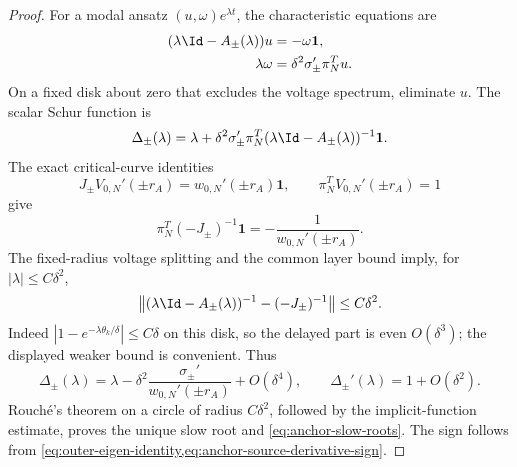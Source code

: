 \begin{proof}
For a modal ansatz \((u,\omega)e^{\lambda t}\), the characteristic equations
are
\begin{align}
 (\lambda\Id-A_\pm(\lambda))u&=-\omega\mathbf1,\notag\\
 \lambda\omega&=\delta^2\sigma_\pm'\pi_N^Tu.        \label{eq:anchor-full-characteristic-system}
\end{align}
On a fixed disk about zero that excludes the voltage spectrum, eliminate
\(u\).  The scalar Schur function is
\begin{equation}
 \Delta_\pm(\lambda)
 =\lambda+\delta^2\sigma_\pm'\pi_N^T
   (\lambda\Id-A_\pm(\lambda))^{-1}\mathbf1.        \label{eq:anchor-slow-Schur-function}
\end{equation}
The exact critical-curve identities
\begin{equation}
 J_\pm V_{0,N}'(\pm r_A)=w_{0,N}'(\pm r_A)\mathbf1,
 \qquad \pi_N^TV_{0,N}'(\pm r_A)=1                 \label{eq:anchor-critical-resolvent-identity}
\end{equation}
give
\begin{equation}
 \pi_N^T(-J_\pm)^{-1}\mathbf1
 =-\frac1{w_{0,N}'(\pm r_A)}.                       \label{eq:anchor-zero-resolvent-value}
\end{equation}
The fixed-radius voltage splitting and the common layer bound imply, for
\(|\lambda|\le C\delta^2\),
\begin{equation}
 \left\|(\lambda\Id-A_\pm(\lambda))^{-1}
          -(-J_\pm)^{-1}\right\|\le C\delta^2.     \label{eq:anchor-small-disk-resolvent}
\end{equation}
Indeed
\(|1-e^{-\lambda\theta_k/\delta}|\le C\delta\) on this disk, so the delayed
part is even \(O(\delta^3)\); the displayed weaker bound is convenient.
Thus
\begin{equation}
 \Delta_\pm(\lambda)
 =\lambda-\delta^2\frac{\sigma_\pm'}
                         {w_{0,N}'(\pm r_A)}
       +O(\delta^4),\qquad
 \Delta_\pm'(\lambda)=1+O(\delta^2).               \label{eq:anchor-Schur-expansion}
\end{equation}
Rouch\'{e}'s theorem on a circle of radius \(C\delta^2\), followed by the
implicit-function estimate, proves the unique slow root and
\cref{eq:anchor-slow-roots}.  The sign follows from
\cref{eq:outer-eigen-identity,eq:anchor-source-derivative-sign}.


\end{proof}
